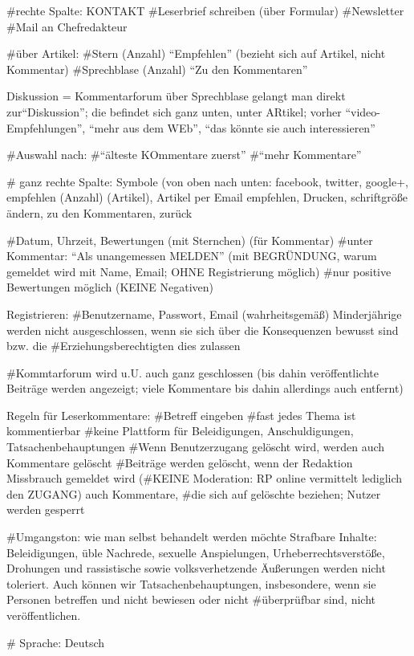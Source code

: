 #rechte Spalte: KONTAKT
	#Leserbrief schreiben (über Formular)
	#Newsletter
	#Mail an Chefredakteur 
	
#über Artikel: 
	#Stern (Anzahl) ``Empfehlen'' (bezieht sich auf Artikel, nicht Kommentar)
	#Sprechblase (Anzahl) ``Zu den Kommentaren''
	
Diskussion = Kommentarforum
über Sprechblase gelangt man direkt zur``Diskussion''; die befindet sich ganz unten, unter ARtikel; vorher ``video-Empfehlungen'', ``mehr aus dem WEb'', ``das könnte sie auch interessieren''


#Auswahl nach:
	#``älteste KOmmentare zuerst''
	#``mehr Kommentare''


# ganz rechte Spalte:  Symbole (von oben nach unten: facebook, twitter, google+, empfehlen (Anzahl) (Artikel), Artikel per Email empfehlen, Drucken, schriftgröße ändern, zu den Kommentaren, zurück


#Datum, Uhrzeit, Bewertungen (mit Sternchen) (für Kommentar)
#unter Kommentar: ``Als unangemessen MELDEN'' (mit BEGRÜNDUNG, warum gemeldet wird mit Name, Email; OHNE Registrierung möglich)
#nur positive Bewertungen möglich (KEINE Negativen)

Registrieren:
#Benutzername, Passwort, Email (wahrheitsgemäß) Minderjährige werden nicht ausgeschlossen, wenn sie sich über die Konsequenzen bewusst sind bzw. die #Erziehungsberechtigten dies zulassen

#Kommtarforum wird u.U. auch ganz geschlossen (bis dahin veröffentlichte Beiträge werden angezeigt; viele Kommentare bis dahin allerdings auch entfernt)


Regeln für Leserkommentare:
#Betreff eingeben 
#fast jedes Thema ist kommentierbar
#keine Plattform für Beleidigungen, Anschuldigungen, Tatsachenbehauptungen
#Wenn Benutzerzugang gelöscht wird, werden auch Kommentare gelöscht
#Beiträge werden gelöscht, wenn der Redaktion Missbrauch gemeldet wird (#KEINE Moderation: RP online vermittelt lediglich den ZUGANG) auch Kommentare, #die sich auf gelöschte beziehen; Nutzer werden gesperrt

#Umgangston: wie man selbst behandelt werden möchte
Strafbare Inhalte: Beleidigungen, üble Nachrede, sexuelle Anspielungen, Urheberrechtsverstöße, Drohungen und rassistische sowie volksverhetzende Äußerungen werden nicht toleriert. Auch können wir Tatsachenbehauptungen, insbesondere, wenn sie Personen betreffen und nicht bewiesen oder nicht #überprüfbar sind, nicht veröffentlichen.
 
# Sprache: Deutsch
 
